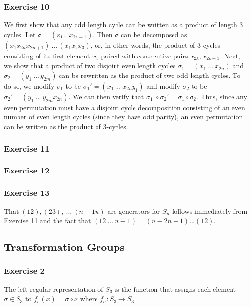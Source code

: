 \subsubsection{Exercise 10}
We first show that any odd length cycle can be written as a product of length 3 cycles. Let $\sigma = 
(x_1 ... x_{2n + 1})$. Then $\sigma$ can be decomposed as $(x_1 x_{2n} x_{2n+1}) \: ... \: (x_1 x_2 x_3)$, or,
in other words, the product of 3-cycles consisting of its first element $x_1$ paired with consecutive pairs
$x_{2k}, x_{2k+1}$. Next, we show that a product of two disjoint even length cycles $\sigma_1 = (x_1 \: ... \: x_{2n})$ 
and $\sigma_2 = (y_1 \: ... \: y_{2m})$ can be rewritten as the product of two odd length cycles. To do so,
we modify $\sigma_1$ to be $\sigma_1' = (x_1 \: ... \: x_{2n} y_1)$ and modify $\sigma_2$ to be 
$\sigma_2' = (y_1 \: ... \: y_{2m} x_{2n})$. We can then verify that $\sigma_1' \circ \sigma_2' = \sigma_1 \circ \sigma_2$. Thus, since any even permutation must have a disjoint cycle decomposition consisting of an even 
number of even length cycles (since they have odd parity), an even permutation can be written as the product
of 3-cycles.

\subsubsection{Exercise 11}

\subsubsection{Exercise 12}

\subsubsection{Exercise 13}
That $(1 2), (2 3), \: ...\:  (n - 1 n)$ are generators for $S_n$ follows immediately from Exercise 11 and the fact 
that $(1 2 \: ... \: n - 1) = (n - 2 n - 1) ... (1 2)$.

\subsection{Transformation Groups}

\subsubsection{Exercise 2}
The left regular representation of $S_3$ is the function that assigns each element $\sigma \in S_3$ to
$f_{\sigma} (x) = \sigma \circ x$ where $f_{\sigma}:  S_3 \to S_3$.


